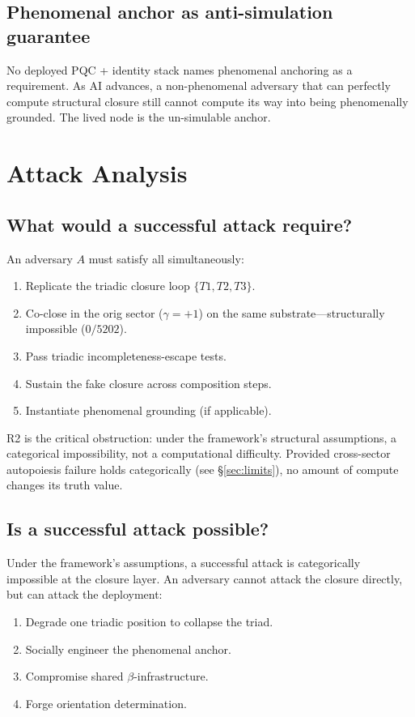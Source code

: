 \documentclass[11pt,a4paper]{article}
\theoremstyle{definition}
\theoremstyle{remark}
\begin{document}
\subsection{Phenomenal anchor as anti-simulation guarantee}

No deployed PQC + identity stack names phenomenal anchoring as a requirement. As AI advances, a non-phenomenal adversary that can perfectly compute structural closure still cannot compute its way into being phenomenally grounded. The lived node is the un-simulable anchor.

\section{Attack Analysis}
\label{sec:attacks}

\subsection{What would a successful attack require?}

An adversary $A$ must satisfy all simultaneously:
\begin{enumerate}[label=(R\arabic*)]
\item Replicate the triadic closure loop $\{T1, T2, T3\}$.
\item Co-close in the orig sector ($\gamma = +1$) on the same substrate---structurally impossible ($0/5202$).
\item Pass triadic incompleteness-escape tests.
\item Sustain the fake closure across composition steps.
\item Instantiate phenomenal grounding (if applicable).
\end{enumerate}

R2 is the critical obstruction: under the framework's structural assumptions, a categorical impossibility, not a computational difficulty. Provided cross-sector autopoiesis failure holds categorically (see \S\ref{sec:limits}), no amount of compute changes its truth value.

\subsection{Is a successful attack possible?}

Under the framework's assumptions, a successful attack is categorically impossible at the closure layer. An adversary cannot attack the closure directly, but can attack the deployment:
\begin{enumerate}[label=(A\arabic*)]
\item Degrade one triadic position to collapse the triad.
\item Socially engineer the phenomenal anchor.
\item Compromise shared $\beta$-infrastructure.
\item Forge orientation determination.
\end{enumerate}
\end{document}

